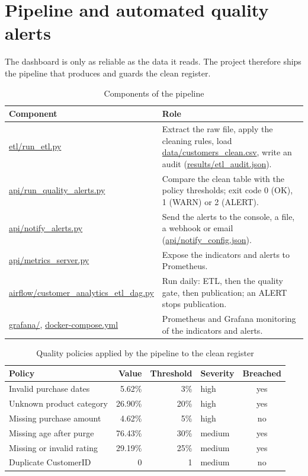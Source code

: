 \documentclass[12pt,a4paper]{article}
\newcommand{\F}[1]{{\small\url{#1}}}
\begin{document}
\section{Pipeline and automated quality alerts}

The dashboard is only as reliable as the data it reads. The project therefore ships
the pipeline that produces and guards the clean register.

\begin{table}[H]\centering\singlespacing
\caption{Components of the pipeline}
\small
\begin{tabularx}{\linewidth}{@{}p{4.4cm}X@{}}
\toprule
\textbf{Component} & \textbf{Role} \\ \midrule
\F{etl/run_etl.py} & Extract the raw file, apply the cleaning rules, load
\F{data/customers_clean.csv}, write an audit (\F{results/etl_audit.json}). \\
\F{api/run_quality_alerts.py} & Compare the clean table with the policy thresholds;
exit code 0 (OK), 1 (WARN) or 2 (ALERT). \\
\F{api/notify_alerts.py} & Send the alerts to the console, a file, a webhook or
email (\F{api/notify_config.json}). \\
\F{api/metrics_server.py} & Expose the indicators and alerts to Prometheus. \\
\F{airflow/customer_analytics_etl_dag.py} & Run daily: ETL, then the quality gate,
then publication; an ALERT stops publication. \\
\F{grafana/}, \F{docker-compose.yml} & Prometheus and Grafana monitoring of the
indicators and alerts. \\
\bottomrule
\end{tabularx}
\end{table}

\begin{table}[H]\centering\singlespacing
\caption{Quality policies applied by the pipeline to the clean register}
\small
\begin{tabular}{@{}lrrlc@{}}
\toprule
\textbf{Policy} & \textbf{Value} & \textbf{Threshold} & \textbf{Severity} & \textbf{Breached} \\ \midrule
Invalid purchase dates & 5.62\% & 3\% & high & yes \\
Unknown product category & 26.90\% & 20\% & high & yes \\
Missing purchase amount & 4.62\% & 5\% & high & no \\
Missing age after purge & 76.43\% & 30\% & medium & yes \\
Missing or invalid rating & 29.19\% & 25\% & medium & yes \\
Duplicate CustomerID & 0 & 1 & medium & no \\
\bottomrule
\end{tabular}
\end{table}
\end{document}
